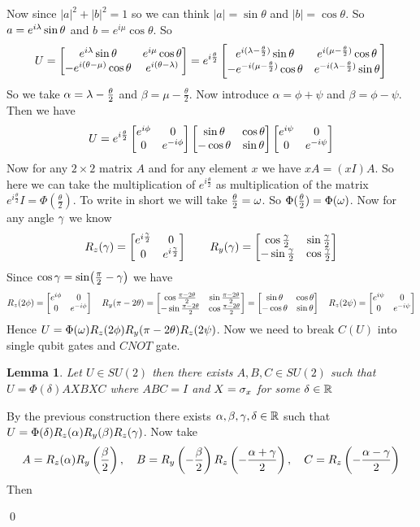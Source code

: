 \documentclass[a4paper, 11pt]{article}
\newtheorem{lemma}{Lemma}
\renewenvironment{proof}{\noindent{\it \textbf{Proof:}}\hspace*{1em}}{\qed\bigskip\\}
\begin{document}
{	Now since $|a|^2+|b|^2=1$ so we can think $|a|=\sin \theta$ and $|b|=\cos \theta $. So $a=e^{i\lambda}\sin \theta$ and $b=e^{i\mu}\cos \theta$. So $$U=\left[\begin{matrix}e^{i\lambda}\sin \theta & e^{i\mu}\cos\theta\\ -e^{i(\theta-\mu)}\cos\theta & e^{i(\theta-\lambda)}\end{matrix}\right]=e^{i\frac{\theta}2}\left[\begin{matrix}e^{i(\lambda-\frac{\theta}2)}\sin \theta & e^{i(\mu-\frac{\theta}2)}\cos\theta\\ -e^{-i(\mu-\frac{\theta}2)}\cos\theta & e^{-i(\lambda-\frac{\theta}2)}\sin\theta\end{matrix}\right]$$So we take $\alpha=\lambda-\frac{\theta}2$ and $\beta=\mu-\frac{\theta}2$. Now introduce $\alpha=\phi+\psi$ and $\beta=\phi-\psi$. Then we have $$U=e^{i\frac{\theta}{2}} \left[\begin{matrix}e^{i\phi} & 0 \\ 0 & e^{-i\phi}\end{matrix}\right]\left[\begin{matrix}\sin\theta & \cos\theta\\ -\cos\theta & \sin\theta\end{matrix}\right]\left[\begin{matrix}e^{i\psi} & 0 \\ 0 & e^{-i\psi}\end{matrix}\right]$$Now for any $2\times 2$ matrix $A$ and for any element $x$ we have $xA=(xI)A$. So here we can take the multiplication of $e^{i\frac{\theta}{2}}$ as multiplication of the matrix $e^{i\frac{\theta}{2}}I=\Phi(\frac{\theta}2)$. To write in short we will take $\frac{\theta}2=\omega$. So $\Phi(\frac{\theta}2)=\Phi(\omega)$. Now for any angle $\gamma$ we know $$R_z(\gamma)=\left[\begin{matrix}e^{i\frac{\gamma}2} & 0 \\ 0 & e^{i\frac{\gamma}{2}}\end{matrix}\right]\qquad R_y(\gamma)=\left[\begin{matrix} \cos \frac{\gamma}2 & \sin\frac{\gamma}2\\ -\sin \frac{\gamma}2 & \cos \frac{\gamma}2 \end{matrix}\right]$$ Since $\cos\gamma=\sin(\frac{\pi}2-\gamma)$ we have $$R_z(2\phi)=\left[\begin{matrix}e^{i\phi} & 0 \\ 0 & e^{-i\phi}\end{matrix}\right]\quad R_y(\pi-2\theta)=\left[\begin{matrix} \cos \frac{\pi-2\theta}2 & \sin\frac{\pi-2\theta}2\\ -\sin \frac{\pi-2\theta}2 & \cos \frac{\pi-2\theta}2 \end{matrix}\right]=\left[\begin{matrix}\sin\theta & \cos\theta\\ -\cos\theta & \sin\theta\end{matrix}\right] \quad R_z(2\psi)=\left[\begin{matrix}e^{i\psi} & 0 \\ 0 & e^{-i\psi}\end{matrix}\right]$$Hence $U=\Phi(\omega)R_z(2\phi)R_y(\pi-2\theta)R_z(2\psi)$. Now we need to break $C(U)$ into single qubit gates and $CNOT$ gate. 
	\begin{lemma}
		Let $U\in SU(2)$ then there exists $A,B,C\in SU(2)$ such that $U=\Phi(\delta)AXBXC$ where $ABC=I$ and $X=\sigma_x$ for some $\delta\in \mathbb{R}$
	\end{lemma}
	\begin{proof}
		By the previous construction there exists $\alpha,\beta,\gamma,\delta\in \mathbb{R}$ such that $U=\Phi(\delta)R_z(\alpha)R_y(\beta)R_z(\gamma)$. Now take $$A=R_z(\alpha)R_y\left(\frac{\beta}{2}\right),\quad B=R_y\left(-\frac{\beta}{2}\right)R_z\left(-\frac{\alpha+\gamma}2\right), \quad C=R_z\left(-\frac{\alpha-\gamma}2\right)$$ Then 

\end{proof}}
\end{document}
